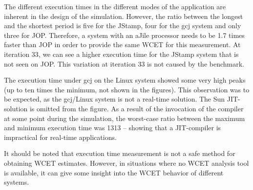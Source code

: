 The different execution times in the different modes of the
application are inherent in the design of the simulation. However,
the ratio between the longest and the shortest period is five for
the JStamp, four for the gcj system and only three for JOP.
Therefore, a system with an aJile processor needs to be 1.7 times
faster than JOP in order to provide the same WCET for this
measurement. At iteration 33, we can see a higher execution time for
the JStamp system that is not seen on JOP. This variation at
iteration 33 is not caused by the benchmark.

The execution time under gcj on the Linux system showed some very
high peaks (up to ten times the minimum, not shown in the figures).
This observation was to be expected, as the gcj/Linux system is not
a real-time solution. The Sun JIT-solution is omitted from the
figure. As a result of the invocation of the compiler at some point
during the simulation, the worst-case ratio between the maximum and
minimum execution time was 1313 -- showing that a JIT-compiler is
impractical for real-time applications.

It should be noted that execution time measurement is not a safe
method for obtaining WCET estimates. However, in situations where no
WCET analysis tool is available, it can give some insight into the
WCET behavior of different systems.


